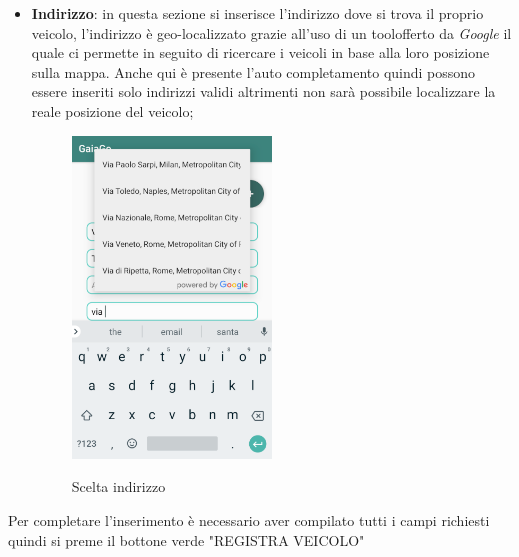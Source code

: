 \begin{itemize}
\item \textbf{Indirizzo}: in questa sezione si inserisce l'indirizzo dove si trova il proprio veicolo, l'indirizzo è geo-localizzato grazie all'uso di un tool\glosp offerto da \textit{Google} il quale ci permette in seguito di ricercare i veicoli in base alla loro posizione sulla mappa. Anche qui è presente l'auto completamento quindi possono essere inseriti solo indirizzi validi altrimenti non sarà possibile localizzare la reale posizione del veicolo;
 \begin{figure}[H] 
	\centering 
	\includegraphics[width=0.5\textwidth]{res/images/indirizzo_auto.png}\\
	\caption{Scelta indirizzo}
	\label{indirizzo}
\end{figure}
\end{itemize}
Per completare l'inserimento è necessario aver compilato tutti i campi richiesti quindi si preme il bottone verde "REGISTRA VEICOLO"
\pagebreak

